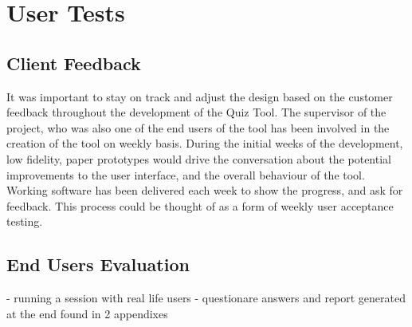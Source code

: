 \section{User Tests}
\subsection{Client Feedback}
It was important to stay on track and adjust the design based on the customer feedback
throughout the development of the Quiz Tool. The supervisor of the project, who was
also one of the end users of the tool has been involved in the creation of the tool on
weekly basis. During the initial weeks of the development, low fidelity, paper prototypes
would drive the conversation about the potential improvements to the user interface, and
the overall behaviour of the tool. Working software has been delivered each week to
show the progress, and ask for feedback. This process could be thought of as a form
of weekly user acceptance testing. 

\subsection{End Users Evaluation}
- running a session with real life users
- questionare answers and report generated at the end found in 2 appendixes

























